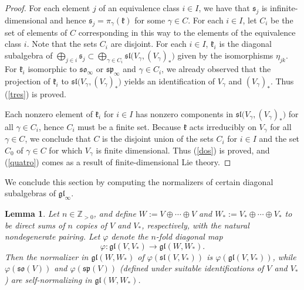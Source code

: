\documentclass{article}
\newcommand {\Z} {\mathbb{Z}}
\def\gl{\mathfrak {gl}}
\def\sl{\mathfrak{sl}}
\def\so{\mathfrak{so}}
\def\sp{\mathfrak{sp}}
\def\k{\mathfrak{k}}
\def\s{\mathfrak{s}}
\newtheorem{lemma}[thm]{Lemma}
\begin{document}
\begin{proof}
For each element $j$ of an equivalence class $i \in I$, we have that $\s_j$ is infinite-dimensional and 
hence $\s_j = \pi_\gamma (\k)$ for some $\gamma \in C$.  
For each $i \in I$, let $C_i$ be the set of elements of $C$ corresponding in this way to the elements of the equivalence class $i$.  
Note that the sets $C_i$ are disjoint.
For each $i \in I$, $\k_i$ is the diagonal subalgebra of $\bigoplus_{j \in i} \s_j \subset \bigoplus_{\gamma \in C_i} \sl \big( V_\gamma , (V_\gamma)_* \big)$ given by the isomorphisms $\eta_{jk}$.  For $\k_i$ isomorphic to $\so_\infty$ or $\sp_\infty$ and $\gamma \in C_i$, we already observed that the projection of $\k_i$ to $\sl \big(V_\gamma , (V_\gamma)_*\big)$ yields an identification of $V_\gamma$ and $(V_\gamma)_*$. 
Thus (\ref{tres}) is proved.

Each nonzero element of $\k_i$ for $i \in I$ has nonzero components in $\sl \big( V_\gamma , (V_\gamma)_* \big)$ for all $\gamma \in C_i$, 
hence $C_i$ must be a finite set.  Because $\k$ acts irreducibly on $V_\gamma$ for all $\gamma \in C$, we conclude that $C$ is the disjoint union of the sets $C_i$ for $i \in I$ and the set $C_0$ of $\gamma \in C$ for which $V_\gamma$ is finite dimensional.  Thus (\ref{dos}) is proved, and (\ref{quatro}) comes as a result of finite-dimensional Lie theory.
\end{proof}


We conclude this section by computing the normalizers of certain diagonal subalgebras of $\gl_\infty$.


\begin{lemma}\label{infinitenormalizer}
Let $n \in \Z_{>0}$, and define $W := V \oplus \cdots \oplus V$ and $W_* := V_* \oplus \cdots \oplus V_*$ to be direct sums of $n$ copies of $V$ and $V_*$, respectively, with the natural nondegenerate pairing.  Let $\varphi$ denote the $n$-fold diagonal map
$$\varphi \colon \gl(V,V_*) \rightarrow \gl(W,W_*).$$
Then the normalizer in $\gl(W,W_*)$ of $\varphi (\sl(V,V_*))$ is $\varphi (\gl(V,V_*))$, while $\varphi (\so(V))$ and $\varphi (\sp(V))$ (defined under suitable identifications of $V$ and $V_*$) are self-normalizing in $\gl(W,W_*)$.
\end{lemma}
\end{document}
